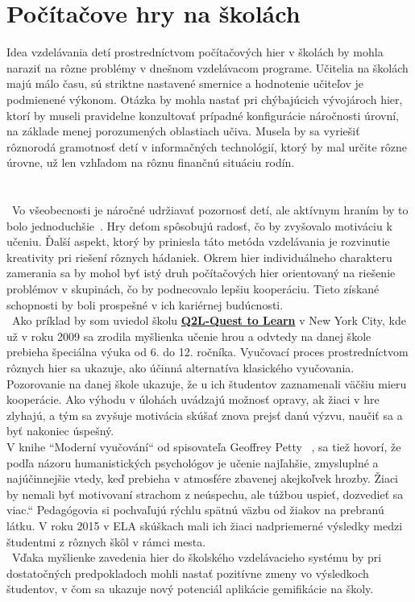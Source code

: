 
\section{Počítačove hry na školách}\label{hry-na-skolach-hodiny-programovania}
Idea vzdelávania detí prostredníctvom počítačových hier v školách by mohla naraziť na 
rôzne problémy v dnešnom vzdelávacom programe. Učitelia na školách majú málo času, sú striktne 
nastavené smernice a hodnotenie učiteľov je podmienené výkonom. Otázka by mohla nastať pri chýbajúcich 
vývojároch hier, ktorí by museli pravidelne konzultovať prípadné konfigurácie náročnosti úrovní, na 
základe menej porozumených oblastiach učiva. Musela by sa vyriešiť rôznorodá gramotnosť detí v informačných 
technológií, ktorý by mal určite rôzne úrovne, už len vzhľadom na rôznu finančnú situáciu rodín.\\\\\\
\indent~Vo všeobecnosti je náročné udržiavať pozornosť detí, ale aktívnym hraním by to bolo jednoduchšie~\cite{6624228}. Hry 
deťom spôsobujú radosť, čo by zvyšovalo motiváciu k učeniu. Ďalší aspekt, ktorý by priniesla táto metóda vzdelávania 
je rozvinutie kreativity pri riešení rôznych hádaniek. Okrem hier individuálneho charakteru zamerania sa 
by mohol byť istý druh počítačových hier orientovaný na riešenie problémov v skupinách, čo by podnecovalo 
lepšiu kooperáciu.\cite{7795662} Tieto získané schopnosti by boli prospešné v ich kariérnej budúcnosti.\\
\indent~Ako príklad by som uviedol školu \textbf{\href{https://www.q2l.org/}{Q2L-Quest to Learn}} v New York City, kde už v roku 2009 sa 
zrodila myšlienka učenie hrou a odvtedy na danej škole prebieha špeciálna výuka od 6. do 12. ročníka. 
Vyučovací proces prostredníctvom rôznych hier sa ukazuje, ako účinná alternatíva klasického vyučovania.
Pozorovanie na danej škole ukazuje, že u ich študentov zaznamenali väčšiu mieru kooperácie. Ako výhodu v úlohách uvádzajú 
možnosť opravy, ak žiaci v hre zlyhajú, a tým sa zvyšuje motivácia skúšať znova prejsť danú výzvu, naučiť 
sa a byť nakoniec úspešný. \\
V knihe ``Moderní vyučování`` od spisovateľa Geoffrey Petty ~\cite{pettyEd}, sa tiež hovorí, že podľa názoru humanistických psychológov je učenie 
najľahšie, zmysluplné a najúčinnejšie vtedy, keď prebieha v atmosfére zbavenej akejkoľvek hrozby. Žiaci by nemali byť motivovaní strachom 
z neúspechu, ale túžbou uspieť, dozvedieť sa viac.“ Pedagógovia si pochvaľujú rýchlu spätnú väzbu od žiakov na prebranú látku. 
V roku 2015 v ELA skúškach mali ich žiaci nadpriemerné výsledky medzi študentmi z rôznych škôl v rámci mesta.\\
\indent~Vďaka myšlienke zavedenia hier do školského vzdelávacieho systému by pri dostatočných predpokladoch mohli nastať pozitívne 
zmeny vo výsledkoch študentov, v čom sa ukazuje nový potenciál aplikácie gemifikácie na školy.
